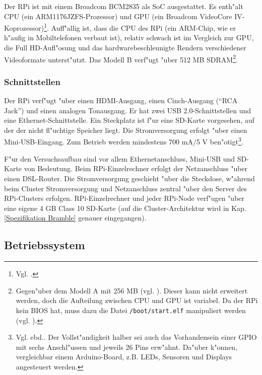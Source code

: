 Der RPi ist mit einem Broadcom BCM2835 als SoC ausgestattet. Es enth"alt CPU (ein ARM1176JZFS-Prozessor) und GPU (ein Broadcom VideoCore IV-Koprozessor)\footnote{Vgl. \cite{scrguide02}.}. Auff"allig ist, dass die CPU des RPi (ein ARM-Chip, wie er h"aufig in Mobiltelefonen verbaut ist), relativ schwach ist im Vergleich zur GPU, die Full HD-Aufl"osung und das hardwarebeschleunigte Rendern verschiedener Videoformate unterst"utzt. Das Modell B verf"ugt "uber 512 MB SDRAM\footnote{Gegen"uber dem Modell A mit 256 MB (vgl. \cite{scrguide02}). Dieser kann nicht erweitert werden, doch die Aufteilung zwischen CPU und GPU ist variabel. Da der RPi kein BIOS hat, muss dazu die Datei \texttt{/boot/start.elf} manipuliert werden (vgl. \cite{pow12}).}.

\subsubsection{Schnittstellen}\label{RPi Schnittstellen}

Der RPi verf"ugt "uber einen HDMI-Ausgang, einen Cinch-Ausgang ("`RCA Jack"') und einen analogen Tonausgang. Er hat zwei USB 2.0-Schnittstellen und eine Ethernet-Schnittstelle. Ein Steckplatz ist f"ur eine SD-Karte vorgesehen, auf der der nicht fl"uchtige Speicher liegt. Die Stromversorgung erfolgt "uber einen Mini-USB-Eingang. Zum Betrieb werden mindestens 700 mA/5 V ben"otigt\footnote{Vgl. ebd.. Der Vollst"andigkeit halber sei auch das Vorhandensein einer GPIO mit sechs Anschl"ussen und jeweils 26 Pins erw"ahnt. Da"uber k"onnen, vergleichbar einem Arduino-Board, z.B. LEDs, Sensoren und Displays angesteuert werden.}. 

\noindent
F"ur den Versuchsaufbau sind vor allem Ethernetanschluss, Mini-USB und SD-Karte von Bedeutung. Beim RPi-Einzelrechner erfolgt der Netzanschluss "uber einen DSL-Router. Die Stromversorgung geschieht "uber die Steckdose, w"ahrend beim Cluster Stromversorgung und Netzanschluss zentral "uber den Server des RPi-Clusters erfolgen. RPi-Einzelrechner und jeder RPi-Node verf"ugen "uber eine eigene 4 GB Class 10 SD-Karte (auf die Cluster-Architektur wird in Kap. \ref{Spezifikation Bramble} genauer eingegangen).

\subsection{Betriebssystem}\label{RPi OS}

